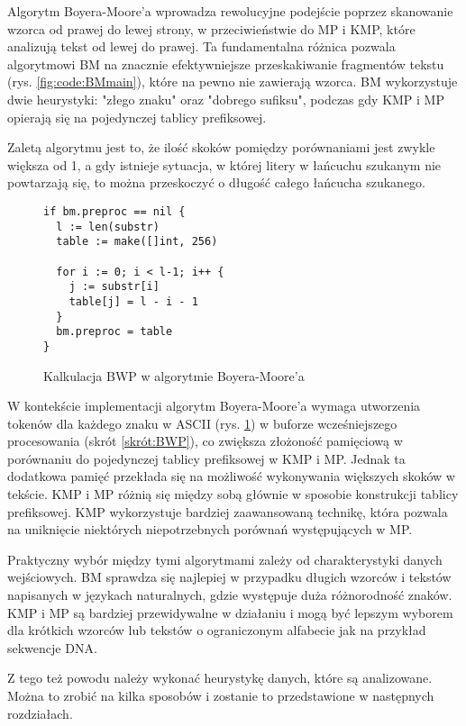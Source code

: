 Algorytm Boyera-Moore'a wprowadza rewolucyjne podejście poprzez skanowanie 
wzorca od prawej do lewej strony, w przeciwieństwie do MP i KMP, które 
analizują tekst od lewej do prawej. Ta fundamentalna różnica pozwala algorytmowi BM na 
znacznie efektywniejsze przeskakiwanie fragmentów tekstu (rys. \ref{fig:code:BMmain}), które na pewno nie 
zawierają wzorca. BM wykorzystuje dwie heurystyki: "złego znaku" oraz "dobrego
sufiksu", podczas gdy KMP i MP opierają się na pojedynczej tablicy prefiksowej.

Zaletą algorytmu jest to, że ilość skoków pomiędzy porównaniami jest zwykle 
większa od 1, a gdy istnieje sytuacja, w której litery w łańcuchu szukanym nie
powtarzają się, to można przeskoczyć o długość całego łańcucha szukanego.

\begin{figure}[htbp]
    \centering
    \begin{lstlisting}
if bm.preproc == nil {
  l := len(substr)
  table := make([]int, 256)

  for i := 0; i < l-1; i++ {
    j := substr[i]
    table[j] = l - i - 1
  }
  bm.preproc = table
}
    \end{lstlisting}
    \caption{Kalkulacja BWP w algorytmie Boyera-Moore'a}
    \label{fig:code:BMpreproc}
\end{figure}

W kontekście implementacji algorytm Boyera-Moore'a wymaga utworzenia tokenów dla
każdego znaku w ASCII (rys. \ref{fig:code:BMpreproc}) w buforze wcześniejszego 
procesowania (skrót \ref{skrót:BWP}), co zwiększa złożoność pamięciową w porównaniu do pojedynczej 
tablicy prefiksowej w KMP i MP. Jednak ta dodatkowa pamięć przekłada się na 
możliwość wykonywania większych skoków w tekście. KMP i MP różnią się między 
sobą głównie w sposobie konstrukcji tablicy prefiksowej. KMP wykorzystuje 
bardziej zaawansowaną technikę, która pozwala na uniknięcie niektórych 
niepotrzebnych porównań występujących w MP.

Praktyczny wybór między tymi algorytmami zależy od charakterystyki danych
wejściowych. BM sprawdza się najlepiej w przypadku długich wzorców i tekstów
napisanych w językach naturalnych, gdzie występuje duża różnorodność znaków.
KMP i MP są bardziej przewidywalne w działaniu i mogą być lepszym wyborem dla 
krótkich wzorców lub tekstów o ograniczonym alfabecie jak na przykład sekwencje
DNA.

Z tego też powodu należy wykonać heurystykę danych, które są analizowane.
Można to zrobić na kilka sposobów i zostanie to przedstawione w następnych rozdziałach.
